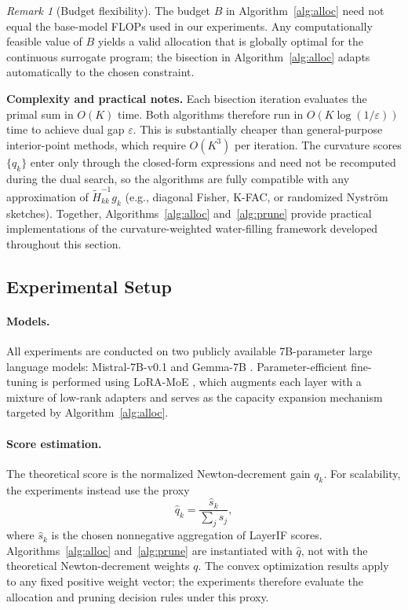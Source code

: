 \documentclass[accepted]{uai2026}%
\theoremstyle{remark}%
\newtheorem*{remark}{Remark}%
\begin{document}
\begin{remark}[Budget flexibility]
The budget $B$ in Algorithm~\ref{alg:alloc} need not equal the
base-model FLOPs used in our experiments.
Any computationally feasible value of $B$ yields a valid allocation that is
globally optimal for the continuous surrogate program;
the bisection in Algorithm~\ref{alg:alloc} adapts automatically
to the chosen constraint.
\end{remark}
\textbf{Complexity and practical notes.}
Each bisection iteration evaluates the primal sum in $O(K)$ time.
Both algorithms therefore run in $O(K\log(1/\varepsilon))$ time to
achieve dual gap $\varepsilon$.
This is substantially cheaper than general-purpose interior-point
methods, which require $O(K^3)$ per iteration.
The curvature scores $\{q_k\}$ enter only through the closed-form
expressions and need not be recomputed during the dual search,
so the algorithms are fully compatible with any approximation of
$\widetilde{H}_{kk}^{-1}g_k$ (e.g., diagonal Fisher, K-FAC, or
randomized Nystr\"{o}m sketches).
Together, Algorithms~\ref{alg:alloc} and~\ref{alg:prune} provide
practical implementations of the curvature-weighted water-filling
framework developed throughout this section.


\vspace{-1mm}
\subsection{Experimental Setup}
\label{sec:experiment}
\vspace{-2mm}

\paragraph{Models.}
All experiments are conducted on two publicly available 7B-parameter
large language models: Mistral-7B-v0.1 \citet{mistral7b} and
Gemma-7B \citet{gemma}.
Parameter-efficient fine-tuning is performed using LoRA-MoE
\citet{MolA}, which augments each layer with a mixture of low-rank
adapters and serves as the capacity expansion mechanism targeted by
Algorithm~\ref{alg:alloc}.


\paragraph{Score estimation.}
The theoretical score is the normalized Newton-decrement gain $q_k$.
For scalability, the experiments instead use the proxy
\[
\widehat q_k=\frac{\widehat s_k}{\sum_j\widehat s_j},
\]
where $\widehat s_k$ is the chosen nonnegative aggregation of LayerIF scores.
Algorithms~\ref{alg:alloc} and~\ref{alg:prune} are instantiated with
$\widehat q$, not with the theoretical Newton-decrement weights $q$.
The convex optimization results apply to any fixed positive weight vector;
the experiments therefore evaluate the allocation and pruning decision rules
under this proxy.
\end{document}
